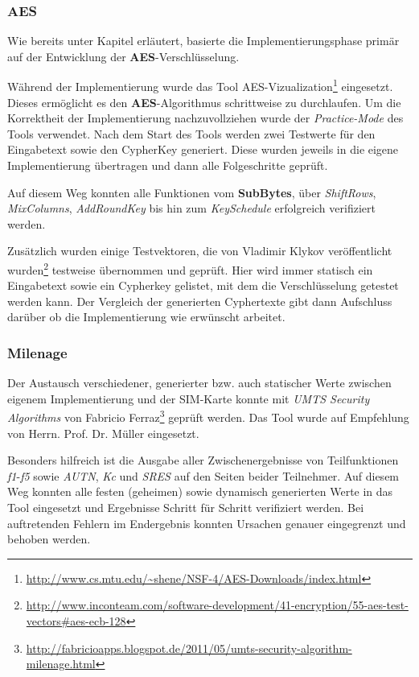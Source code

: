 		\subsubsection{AES}
		Wie bereits unter Kapitel  erläutert, basierte die Implementierungsphase
		primär auf der Entwicklung der \textbf{AES}-Verschlüsselung. 

		Während der Implementierung wurde das Tool AES-Vizualization\footnote{\url{http://www.cs.mtu.edu/~shene/NSF-4/AES-Downloads/index.html}} eingesetzt.
		Dieses ermöglicht es den \textbf{AES}-Algorithmus schrittweise zu durchlaufen.
		Um die Korrektheit der Implementierung nachzuvollziehen wurde der \textit{Practice-Mode}
		des Tools verwendet. Nach dem Start des Tools werden zwei Testwerte für den
		Eingabetext sowie den CypherKey generiert. Diese wurden jeweils in die eigene
		Implementierung übertragen und dann alle Folgeschritte geprüft.

		Auf diesem Weg konnten alle Funktionen vom \textbf{SubBytes}, über \textit{ShiftRows},
		\textit{MixColumns}, \textit{AddRoundKey} bis hin zum \textit{KeySchedule} erfolgreich verifiziert
		werden.

		Zusätzlich wurden einige Testvektoren, die von Vladimir Klykov veröffentlicht
		wurden\footnote{\url{http://www.inconteam.com/software-development/41-encryption/55-aes-test-vectors\#aes-ecb-128}}
		testweise übernommen und geprüft. Hier wird immer statisch ein Eingabetext sowie ein
		Cypherkey gelistet, mit dem die Verschlüsselung getestet werden kann. Der Vergleich
		der generierten Cyphertexte gibt dann Aufschluss darüber ob die Implementierung
		wie erwünscht arbeitet.


		\subsubsection{Milenage}
		Der Austausch verschiedener, generierter bzw. auch statischer Werte zwischen eigenem
		Implementierung und der SIM-Karte konnte mit \textit{UMTS Security Algorithms}
		von Fabricio Ferraz\footnote{\url{http://fabricioapps.blogspot.de/2011/05/umts-security-algorithm-milenage.html}}
		geprüft werden. Das Tool wurde auf Empfehlung von Herrn. Prof. Dr. Müller eingesetzt.

		Besonders hilfreich ist die Ausgabe aller Zwischenergebnisse von Teilfunktionen
		\textit{f1}-\textit{f5} sowie \textit{AUTN}, \textit{Kc} und \textit{SRES} auf
		den Seiten beider Teilnehmer. Auf diesem Weg konnten alle festen (geheimen) sowie
		dynamisch generierten Werte in das Tool eingesetzt und Ergebnisse Schritt für
		Schritt verifiziert werden. Bei auftretenden Fehlern im Endergebnis konnten Ursachen
		genauer eingegrenzt und behoben werden.

